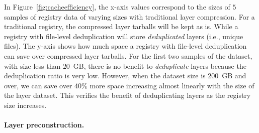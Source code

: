In Figure~\ref{fig:cacheefficiency}, the x-axis values correspond to the sizes of $5$ samples of registry data of varying sizes with traditional layer compression. For a traditional registry, the compressed layer tarballs will be kept as is.
While a registry with file-level deduplication will store \emph{deduplicated} layers (i.e., unique files). 
The y-axis shows how much space a registry with file-level deduplication can save over compressed layer tarballs.
For the first two samples of the dataset, with size less than $20$~GB, 
there is no benefit to \emph{deduplicate} layers because the deduplication ratio is very low.
However, when the dataset size is $200$~GB and over, we can save over $40\%$ more space increasing almost linearly with the size of the layer dataset.
This verifies the benefit of deduplicating layers as the registry size increases.

\paragraph{Layer preconstruction.}
%
%



